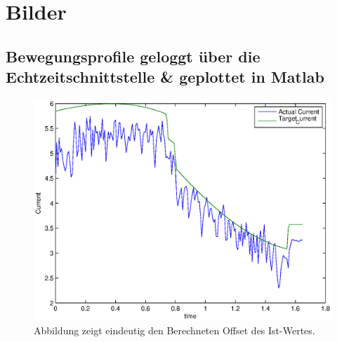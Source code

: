 \chapter{Bilder}
\label{bewegungsprofile_anhang}

\section{Bewegungsprofile geloggt über die Echtzeitschnittstelle \& geplottet in Matlab}
\label{sec:profile_polyscope_rci}

\begin{figure}[H]
  \centering
    \includegraphics[width=1\textwidth]{pic/joint1_polyscope_current.eps}
      \caption[Soll-und Ist-Werte der Stromstärke wärend der Bewegung des 2.Gelenks mit Polyscope]{Abbildung zeigt eindeutig den Berechneten Offset des Ist-Wertes.}
      \label{fig:current_profile_joint1_rci}
\end{figure}

